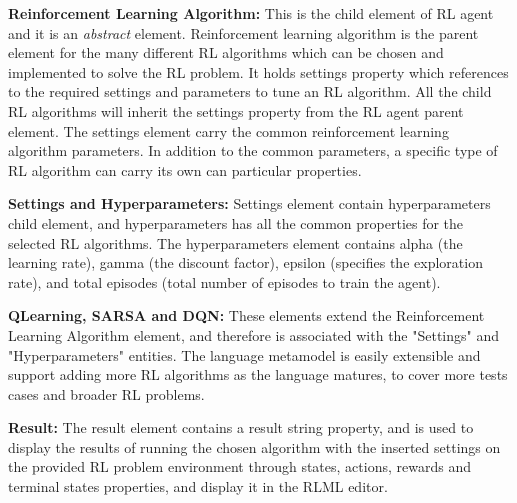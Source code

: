 \documentclass[11pt,letterpaper]{ryersonSGSThesis}
\begin{document}
\begin{ryersonSGSThesis}
        \textbf{Reinforcement Learning Algorithm:} This is the child element of RL agent and it is an \emph{abstract} element. Reinforcement learning algorithm is the parent element for the many different RL algorithms which can be chosen and implemented to solve the RL problem. It holds settings property which references to the required settings and parameters to tune an RL algorithm. All the child RL algorithms will inherit the settings property from the RL agent parent element. The settings element carry the common reinforcement learning algorithm parameters. In addition to the common parameters, a specific type of RL algorithm can carry its own can particular properties.
        
        \textbf{Settings and Hyperparameters:} Settings element contain hyperparameters child element, and hyperparameters has all the common properties for the selected RL algorithms. The hyperparameters element contains alpha (the learning rate), gamma (the discount factor), epsilon (specifies the exploration rate), and total episodes (total number of episodes to train the agent).
        
        \textbf{QLearning, SARSA and DQN:} These elements extend the Reinforcement Learning Algorithm element, and therefore is associated with the "Settings" and "Hyperparameters" entities. The language metamodel is easily extensible and support adding more RL algorithms as the language matures, to cover more tests cases and broader RL problems.
        
        \textbf{Result:} The result element contains a result string property, and is used to display the results of running the chosen algorithm with the inserted settings on the provided RL problem environment through states, actions, rewards and terminal states properties, and display it in the RLML editor.
        
        

\end{ryersonSGSThesis}
\end{document}
